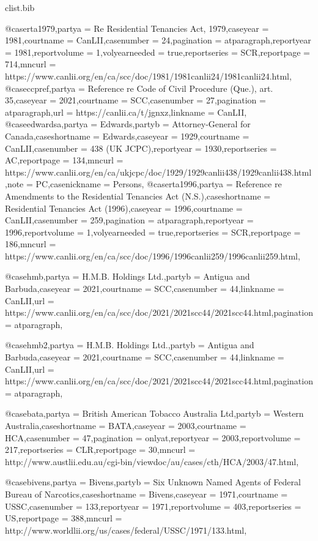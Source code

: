 \begin{filecontents*}[overwrite]{clist\jobname.bib}

@case{rta1979,partya =  {Re Residential Tenancies Act, 1979},caseyear =  {1981},courtname =  {CanLII},casenumber =  {24},pagination =  {atparagraph},reportyear =  {1981},reportvolume =  {1},volyearneeded =  {true},reportseries =  {SCR},reportpage =  {714},mncurl =  {https://www.canlii.org/en/ca/scc/doc/1981/1981canlii24/1981canlii24.html},}
@case{ccpref,partya =  {Reference re Code of Civil Procedure (Que.), art. 35},caseyear =  {2021},courtname =  {SCC},casenumber =  {27},pagination =  {atparagraph},url =  {https://canlii.ca/t/jgnxz},linkname =  {CanLII},}
@case{edwardsa,partya =  {Edwards},partyb =  {Attorney‑General for Canada},caseshortname =  {Edwards},caseyear =  {1929},courtname =  {CanLII},casenumber =  {438 (UK JCPC)},reportyear =  {1930},reportseries =  {AC},reportpage =  {134},mncurl =  {https://www.canlii.org/en/ca/ukjcpc/doc/1929/1929canlii438/1929canlii438.html},note =  {PC},casenickname =  {Persons},}
@case{rta1996,partya =  {Reference re Amendments to the Residential Tenancies Act (N.S.)},caseshortname =  {Residential Tenancies Act (1996)},caseyear =  {1996},courtname =  {CanLII},casenumber =  {259},pagination =  {atparagraph},reportyear =  {1996},reportvolume =  {1},volyearneeded =  {true},reportseries =  {SCR},reportpage =  {186},mncurl =  {https://www.canlii.org/en/ca/scc/doc/1996/1996canlii259/1996canlii259.html},}

@case{hmb,partya = {H.M.B. Holdings Ltd.},partyb = {Antigua and Barbuda},caseyear = {2021},courtname = {SCC},casenumber = {44},linkname = {CanLII},url = {https://www.canlii.org/en/ca/scc/doc/2021/2021scc44/2021scc44.html},pagination = {atparagraph},}

@case{hmb2,partya = {H.M.B. Holdings Ltd.\@},partyb = {Antigua and Barbuda},caseyear = {2021},courtname = {SCC},casenumber = {44},linkname = {CanLII},url = {https://www.canlii.org/en/ca/scc/doc/2021/2021scc44/2021scc44.html},pagination = {atparagraph},}


@case{bata,partya =  {British American Tobacco Australia Ltd},partyb =  {Western Australia},caseshortname =  {BATA},caseyear =  {2003},courtname =  {HCA},casenumber =  {47},pagination =  {onlyat},reportyear =  {2003},reportvolume =  {217},reportseries =  {CLR},reportpage =  {30},mncurl =  {http://www.austlii.edu.au/cgi-bin/viewdoc/au/cases/cth/HCA/2003/47.html},}

@case{bivens,partya =  {Bivens},partyb =  {Six Unknown Named Agents of Federal Bureau of Narcotics},caseshortname =  {Bivens},caseyear =  {1971},courtname =  {USSC},casenumber =  {133},reportyear =  {1971},reportvolume =  {403},reportseries =  {US},reportpage =  {388},mncurl =  {http://www.worldlii.org/us/cases/federal/USSC/1971/133.html},}


\end{filecontents*}
